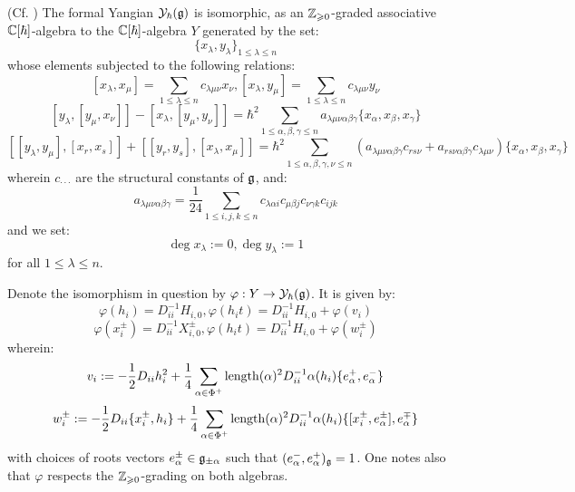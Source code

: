         \begin{theorem} \label{theorem: drinfeld_current_presentation}
            (Cf. \cite[Theorem 12.1.3]{chari_pressley_quantum_groups}) The formal Yangian $\mathcal{Y}_{\hbar}(\mathfrak{g})$ is isomorphic, as an $\mathbb{Z}_{\geqslant 0}$-graded associative $\mathbb{C}[\hbar]$-algebra to the $\mathbb{C}[\hbar]$-algebra $Y$ generated by the set:
                $$\{ x_{\lambda}, y_{\lambda} \}_{1 \leq \lambda \leq n}$$
            whose elements subjected to the following relations:
                $$[ x_{\lambda}, x_{\mu} ] = \sum_{1 \leq \lambda \leq n} c_{\lambda \mu \nu} x_{\nu}, [ x_{\lambda}, y_{\mu} ] = \sum_{1 \leq \lambda \leq n} c_{\lambda \mu \nu} y_{\nu}$$
                $$[ y_{\lambda}, [y_{\mu}, x_{\nu}] ] - [ x_{\lambda}, [y_{\mu}, y_{\nu}] ] = \hbar^2 \sum_{1 \leq \alpha, \beta, \gamma \leq n} a_{\lambda \mu \nu \alpha \beta \gamma} \{ x_{\alpha}, x_{\beta}, x_{\gamma} \}$$
                $$[ [y_{\lambda}, y_{\mu}], [x_r, x_s] ] + [ [y_r, y_s], [x_{\lambda}, x_{\mu}] ] = \hbar^2 \sum_{1 \leq \alpha, \beta, \gamma, \nu \leq n} ( a_{\lambda \mu \nu \alpha \beta \gamma} c_{r s \nu} + a_{r s \nu \alpha \beta \gamma} c_{\lambda \mu \nu} ) \{ x_{\alpha}, x_{\beta}, x_{\gamma} \}$$
            wherein $c_{\cdot \cdot \cdot}$ are the structural constants of $\mathfrak{g}$, and:
                $$a_{\lambda \mu \nu \alpha \beta \gamma} = \frac{1}{24} \sum_{1 \leq i, j, k \leq n} c_{\lambda \alpha i} c_{\mu \beta j} c_{\nu \gamma k} c_{i j k}$$
            and we set:
                $$\deg x_{\lambda} := 0, \deg y_{\lambda} := 1$$
            for all $1 \leq \lambda \leq n$.
            
            Denote the isomorphism in question by $\varphi: Y \to \mathcal{Y}_{\hbar}(\mathfrak{g})$. It is given by:
                $$\varphi(h_i) = D_{ii}^{-1} H_{i, 0}, \varphi(h_i t) = D_{ii}^{-1} H_{i, 0} + \varphi(v_i)$$
                $$\varphi(x_i^{\pm}) = D_{ii}^{-1} X_{i, 0}^{\pm}, \varphi(h_i t) = D_{ii}^{-1} H_{i, 0} + \varphi(w_i^{\pm})$$
            wherein:
                $$v_i := -\frac12 D_{ii} h_i^2 + \frac14 \sum_{\alpha \in \Phi^+} \operatorname{length}(\alpha)^2 D_{ii}^{-1} \alpha(h_i) \{e_{\alpha}^+, e_{\alpha}^-\}$$
                $$w_i^{\pm} := -\frac12 D_{ii} \{x_i^{\pm}, h_i\} + \frac14 \sum_{\alpha \in \Phi^+} \operatorname{length}(\alpha)^2 D_{ii}^{-1} \alpha(h_i) \{[x_i^{\pm}, e_{\alpha}^{\pm}], e_{\alpha}^{\mp}\}$$
            with choices of roots vectors $e_{\alpha}^{\pm} \in \mathfrak{g}_{\pm \alpha}$ such that $(e_{\alpha}^-, e_{\alpha}^+)_{\mathfrak{g}} = 1$. One notes also that $\varphi$ respects the $\mathbb{Z}_{\geqslant 0}$-grading on both algebras.
        \end{theorem}


